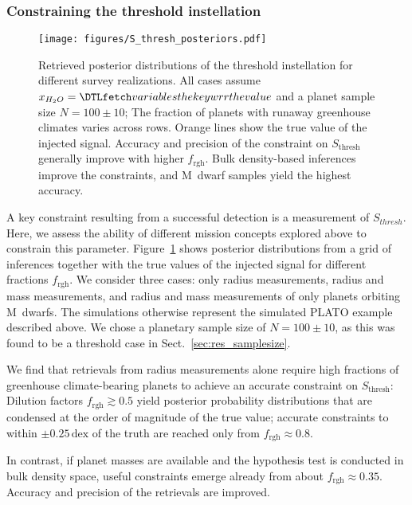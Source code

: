 \documentclass[twocolumn,twocolappendix]{aastex631}
\begin{document}
\subsubsection{Constraining the threshold instellation}\label{sec:res_constrain-S_thresh}
\begin{figure}[ht!]
    \begin{centering}
        \texttt{[image: figures/S\_thresh\_posteriors.pdf]}
        \caption{
            Retrieved posterior distributions of the threshold instellation for different survey realizations.
            All cases assume $x_{H_2O} = \var{wrr}$ and a planet sample size $N=100\pm10$; The fraction of planets with runaway greenhouse climates varies across rows.
            Orange lines show the true value of the injected signal.
            Accuracy and precision of the constraint on $S_\mathrm{thresh}$ generally improve with higher $f_\mathrm{rgh}$.
            Bulk density-based inferences improve the constraints, and M~dwarf samples yield the highest accuracy.
        }
        \label{fig:posterior_surveys}
    \end{centering}
\end{figure}
A key constraint resulting from a successful detection is a measurement of $S_{thresh}$.
Here, we assess the ability of different mission concepts explored above to constrain this parameter.
Figure~\ref{fig:posterior_surveys} shows posterior distributions from a grid of inferences together with the true values of the injected signal for different fractions $f_\mathrm{rgh}$.
We consider three cases: only radius measurements, radius and mass measurements, and radius and mass measurements of only planets orbiting M~dwarfs.
The simulations otherwise represent the simulated PLATO example described above.
We chose a planetary sample size of $N=100\pm10$, as this was found to be a threshold case in Sect.~\ref{sec:res_samplesize}.

We find that retrievals from radius measurements alone require high fractions of greenhouse climate-bearing planets to achieve an accurate constraint on $S_\mathrm{thresh}$:
Dilution factors $f_\mathrm{rgh} \gtrsim 0.5$ yield posterior probability distributions that are condensed at the order of magnitude of the true value; accurate constraints to within $\pm 0.25\,\mathrm{dex}$ of the truth are reached only from $f_\mathrm{rgh} \approx 0.8$.

In contrast, if planet masses are available and the hypothesis test is conducted in bulk density space, useful constraints emerge already from about $f_\mathrm{rgh} \approx 0.35$.
Accuracy and precision of the retrievals are improved.
\end{document}
